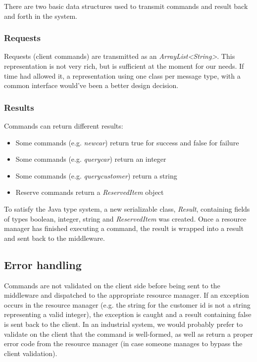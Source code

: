\documentclass[11pt]{article}
\begin{document}
There are two basic data structures used to transmit commands and
result back and forth in the system.

\subsubsection{Requests}

Requests (client commands) are transmitted as an {\it
  ArrayList<String>}.  This representation is not very rich, but is
sufficient at the moment for our needs.  If time had allowed it, a
representation using one class per message type, with a common
interface would've been a better design decision.

\subsubsection{Results}

Commands can return different results:

\begin{itemize}
\item Some commands (e.g. {\it newcar}) return true for success and
  false for failure
\item Some commands (e.g. {\it querycar}) return an integer
\item Some commands (e.g. {\it querycustomer}) return a string
\item Reserve commands return a {\it ReservedItem} object
\end{itemize}

To satisfy the Java type system, a new serializable class, {\it
  Result}, containing fields of types boolean, integer, string and
{\it ReservedItem} was created.  Once a resource manager has finished
executing a command, the result is wrapped into a result and sent back
to the middleware.

\subsection{Error handling}

Commands are not validated on the client side before being sent to the
middleware and dispatched to the appropriate resource manager.  If an
exception occurs in the resource manager (e.g. the string for the
customer id is not a string representing a valid integer), the
exception is caught and a result containing false is sent back to the
client.  In an industrial system, we would probably prefer to validate
on the client that the command is well-formed, as well as return a
proper error code from the resource manager (in case someone manages
to bypass the client validation).
\end{document}
